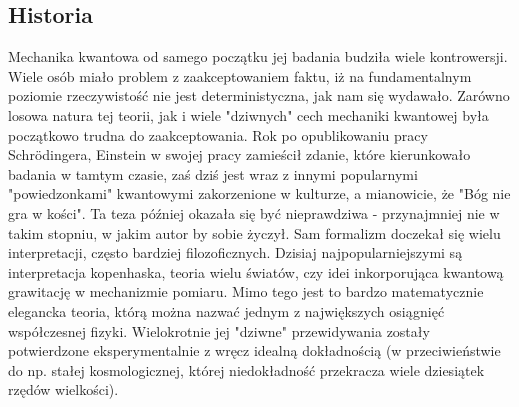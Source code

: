 \documentclass[10pt]{article} %
\begin{document}
\subsection{Historia}
Mechanika kwantowa od samego początku jej badania budziła wiele kontrowersji. Wiele osób miało problem z zaakceptowaniem faktu, iż
na fundamentalnym poziomie rzeczywistość nie jest deterministyczna, jak nam się wydawało. Zarówno losowa natura tej teorii, jak i wiele "dziwnych" cech mechaniki kwantowej była początkowo trudna do zaakceptowania. Rok po opublikowaniu pracy Schrödingera, Einstein w swojej pracy zamieścił zdanie, które kierunkowało badania w tamtym czasie, zaś dziś jest wraz z innymi popularnymi "powiedzonkami" kwantowymi zakorzenione w kulturze, a mianowicie, że "Bóg nie gra w kości". Ta teza później okazała się być nieprawdziwa - przynajmniej nie w takim stopniu, w jakim autor by sobie życzył. Sam formalizm doczekał się wielu interpretacji, często bardziej filozoficznych. Dzisiaj najpopularniejszymi są interpretacja kopenhaska, teoria wielu światów, czy idei inkorporująca kwantową grawitację w mechanizmie pomiaru. Mimo tego jest to bardzo matematycznie elegancka teoria, którą można nazwać jednym z największych osiągnięć współczesnej fizyki. Wielokrotnie jej "dziwne" przewidywania zostały potwierdzone eksperymentalnie z wręcz idealną dokładnością (w przeciwieństwie do np. stałej kosmologicznej, której niedokładność przekracza wiele dziesiątek rzędów wielkości). 
\end{document}
